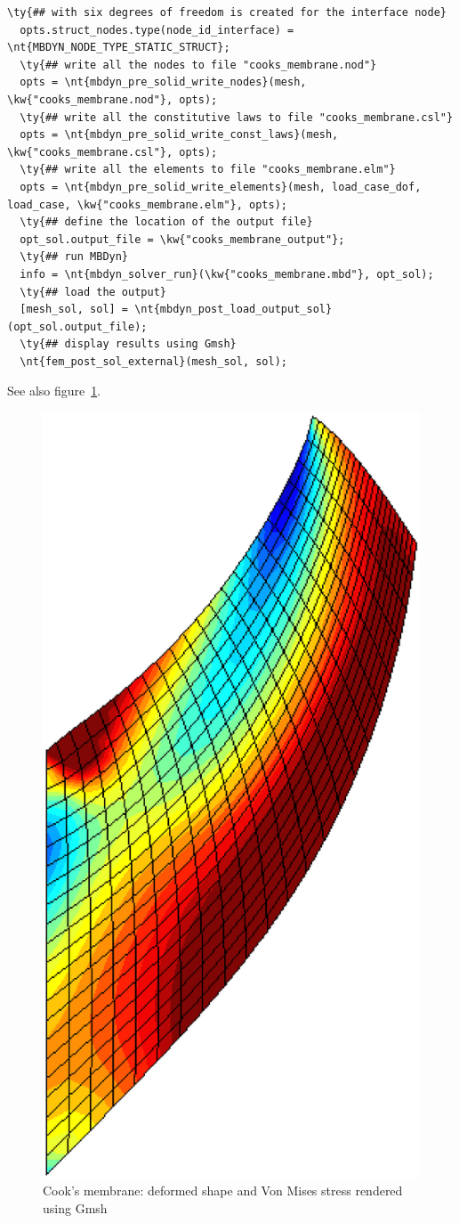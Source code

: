 \begin{Verbatim}[commandchars=\\\{\}]
  \ty{## with six degrees of freedom is created for the interface node}
  opts.struct_nodes.type(node_id_interface) = \nt{MBDYN_NODE_TYPE_STATIC_STRUCT};
  \ty{## write all the nodes to file "cooks_membrane.nod"}
  opts = \nt{mbdyn_pre_solid_write_nodes}(mesh, \kw{"cooks_membrane.nod"}, opts);
  \ty{## write all the constitutive laws to file "cooks_membrane.csl"}
  opts = \nt{mbdyn_pre_solid_write_const_laws}(mesh, \kw{"cooks_membrane.csl"}, opts);
  \ty{## write all the elements to file "cooks_membrane.elm"}
  opts = \nt{mbdyn_pre_solid_write_elements}(mesh, load_case_dof, load_case, \kw{"cooks_membrane.elm"}, opts);
  \ty{## define the location of the output file}
  opt_sol.output_file = \kw{"cooks_membrane_output"};
  \ty{## run MBDyn}
  info = \nt{mbdyn_solver_run}(\kw{"cooks_membrane.mbd"}, opt_sol);
  \ty{## load the output}
  [mesh_sol, sol] = \nt{mbdyn_post_load_output_sol}(opt_sol.output_file);
  \ty{## display results using Gmsh}
  \nt{fem_post_sol_external}(mesh_sol, sol);
\end{Verbatim}
See also figure~\ref{fig:EL:SOLID:COOKS-MEMBRANE}.
\begin{figure}[htb]
\centering
\includegraphics[width=.25\textwidth]{elemsolid}
\caption{Cook's membrane: deformed shape and Von Mises stress rendered using Gmsh}
\label{fig:EL:SOLID:COOKS-MEMBRANE}
\end{figure}
